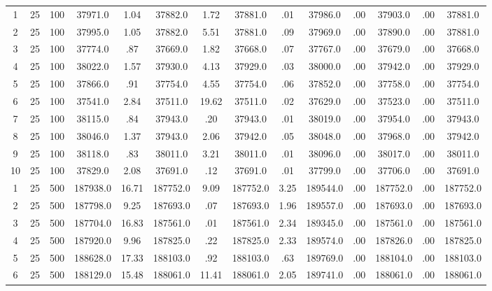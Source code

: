 \documentclass[12pt,a4paper]{article}
\begin{document}
\begin{center}
{\begin{tabular}{|ccc|cc|cc|cc|cc|cc|c|}
1             &  25& 100&  37971.0& 1.04&  37882.0& 1.72&  37881.0&  .01&  37986.0&  .00&  37903.0&  .00&  37881.0\\[-0.01in]
2             &  25& 100&  37995.0& 1.05&  37882.0& 5.51&  37881.0&  .09&  37969.0&  .00&  37890.0&  .00&  37881.0\\[-0.01in]
3             &  25& 100&  37774.0&  .87&  37669.0& 1.82&  37668.0&  .07&  37767.0&  .00&  37679.0&  .00&  37668.0\\[-0.01in]
4             &  25& 100&  38022.0& 1.57&  37930.0& 4.13&  37929.0&  .03&  38000.0&  .00&  37942.0&  .00&  37929.0\\[-0.01in]
5             &  25& 100&  37866.0&  .91&  37754.0& 4.55&  37754.0&  .06&  37852.0&  .00&  37758.0&  .00&  37754.0\\[-0.01in]
6             &  25& 100&  37541.0& 2.84&  37511.0&19.62&  37511.0&  .02&  37629.0&  .00&  37523.0&  .00&  37511.0\\[-0.01in]
7             &  25& 100&  38115.0&  .84&  37943.0&  .20&  37943.0&  .01&  38019.0&  .00&  37954.0&  .00&  37943.0\\[-0.01in]
8             &  25& 100&  38046.0& 1.37&  37943.0& 2.06&  37942.0&  .05&  38048.0&  .00&  37968.0&  .00&  37942.0\\[-0.01in]
9             &  25& 100&  38118.0&  .83&  38011.0& 3.21&  38011.0&  .01&  38096.0&  .00&  38017.0&  .00&  38011.0\\[-0.01in]
10            &  25& 100&  37829.0& 2.08&  37691.0&  .12&  37691.0&  .01&  37799.0&  .00&  37706.0&  .00&  37691.0\\[-0.01in]
1             &  25& 500& 187938.0&16.71& 187752.0& 9.09& 187752.0& 3.25& 189544.0&  .00& 187752.0&  .00& 187752.0\\[-0.01in]
2             &  25& 500& 187798.0& 9.25& 187693.0&  .07& 187693.0& 1.96& 189557.0&  .00& 187693.0&  .00& 187693.0\\[-0.01in]
3             &  25& 500& 187704.0&16.83& 187561.0&  .01& 187561.0& 2.34& 189345.0&  .00& 187561.0&  .00& 187561.0\\[-0.01in]
4             &  25& 500& 187920.0& 9.96& 187825.0&  .22& 187825.0& 2.33& 189574.0&  .00& 187826.0&  .00& 187825.0\\[-0.01in]
5             &  25& 500& 188628.0&17.33& 188103.0&  .92& 188103.0&  .63& 189769.0&  .00& 188104.0&  .00& 188103.0\\[-0.01in]
6             &  25& 500& 188129.0&15.48& 188061.0&11.41& 188061.0& 2.05& 189741.0&  .00& 188061.0&  .00& 188061.0\\[-0.01in]

\end{tabular}}
\end{center}
\end{document}
